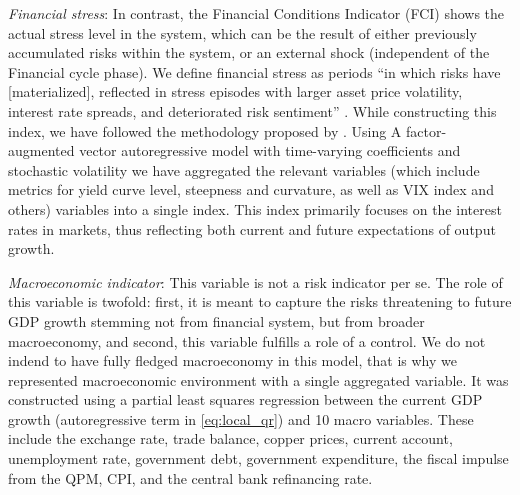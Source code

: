 \documentclass[12pt,a4paper]{article}
\begin{document}
\textit{Financial stress}: In contrast, the Financial Conditions Indicator (FCI) shows the actual stress level in the system, which can be the result of either previously accumulated risks within the system, or an external shock (independent of the Financial cycle phase). We define financial stress as periods ``in which risks have [materialized], reflected in stress episodes with larger asset price volatility, interest rate spreads, and deteriorated risk sentiment'' \citep{esrb2021}. While constructing this index, we have followed the methodology proposed by \citet{koop_2013}. Using A factor-augmented vector autoregressive model with time-varying coefficients and stochastic volatility we have aggregated the relevant variables (which include metrics for yield curve level, steepness and curvature, as well as VIX index and others) variables into a single index. This index primarily focuses on the interest rates in markets, thus reflecting both current and future expectations of output growth.

\textit{Macroeconomic indicator}: This variable is not a risk indicator per se. The role of this variable is twofold: first, it is meant to capture the risks threatening to future GDP growth stemming not from financial system, but from broader macroeconomy, and second, this variable fulfills a role of a control. We do not indend to have fully fledged macroeconomy in this model, that is why we represented macroeconomic environment with a single aggregated variable. It was constructed using a partial least squares regression between the current GDP growth (autoregressive term in \autoref{eq:local_qr}) and 10 macro variables. These include the exchange rate, trade balance, copper prices, current account, unemployment rate, government debt, government expenditure, the fiscal impulse from the QPM, CPI, and the central bank refinancing rate. 
\end{document}
